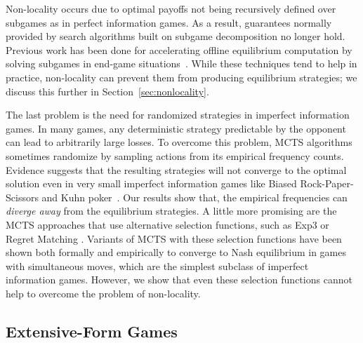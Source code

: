 \documentclass{aamas2015}
\begin{document}
Non-locality occurs due to optimal payoffs not being recursively defined over subgames as 
in perfect information games. As a result, guarantees normally provided by search algorithms built on 
subgame decomposition no longer hold. 
Previous work has been done for accelerating offline equilibrium computation by solving subgames in end-game situations~\cite{Gilpin06Competitive,Gilpin07Better,Ganzfried13Endgame}. While these techniques tend to help in practice, 
non-locality can prevent them from producing equilibrium strategies; we discuss this further in Section~\ref{sec:nonlocality}. 

The last problem %
is the need for randomized strategies in imperfect information games. In many games, any deterministic 
strategy predictable by the opponent can lead to arbitrarily large losses.
To overcome this problem, MCTS algorithms sometimes randomize by sampling actions from its empirical frequency counts.
Evidence suggests that the resulting strategies will not converge to the optimal solution even in very
small imperfect information games like Biased Rock-Paper-Scissors and Kuhn poker~\cite{Shafiei09,Ponsen11Computing}.
Our results show that, the empirical frequencies can {\it diverge away} from the equilibrium strategies.
A little more promising are the MCTS approaches that use alternative selection functions, such as Exp3 or Regret Matching \cite{Lisy14selection}. 
Variants of MCTS with these selection functions have been shown both formally and empirically \cite{Lisy13nips,Lanctot13smmcts} to converge to Nash equilibrium in games with simultaneous moves, which are the simplest subclass of imperfect information games. However, we show that even these selection functions cannot help to overcome the problem of non-locality.%

\subsection{Extensive-Form Games}
\end{document}
